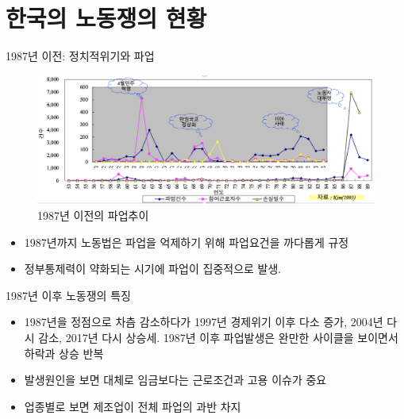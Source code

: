 \documentclass[aspectratio=169,xcolor=dvipsnames,handout]{beamer}
\begin{document}
\section{한국의 노동쟁의 현황}%

\begin{frame}{1987년 이전: 정치적위기와 파업}
    \begin{figure}
        \centering
        \includegraphics[width=.7\textwidth]{pic/87년이전파업.png}
        \caption{1987년 이전의 파업추이}
    \end{figure}
    \begin{itemize}[<+->]
        \item 1987년까지 노동법은 파업을 억제하기 위해 파업요건을 까다롭게 규정 
        \item 정부통제력이 약화되는 시기에 파업이 집중적으로 발생. 
    \end{itemize}
\end{frame}

\begin{frame}{1987년 이후 노동쟁의 특징}
    \begin{itemize}[<+->]
        \item 1987년을 정점으로 차츰 감소하다가 1997년 경제위기 이후 다소 증가, 2004년 다시 감소, 2017년 다시 상승세. 1987년 이후 파업발생은 완만한 사이클을 보이면서 하락과 상승 반복 
        \item 발생원인을 보면 대체로 임금보다는 근로조건과 고용 이슈가 중요
        \item 업종별로 보면 제조업이 전체 파업의 과반 차지
    \end{itemize}
\end{frame}


\end{document}
